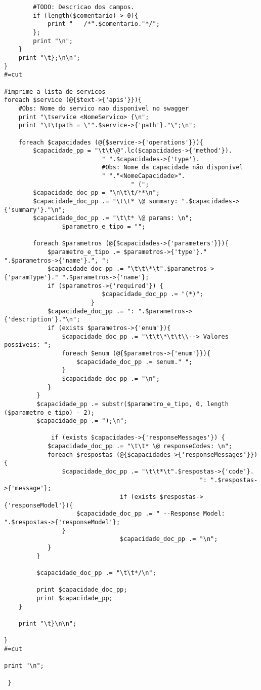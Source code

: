 \begin{lstlisting}
		#TODO: Descricao dos campos.
		if (length($comentario) > 0){
			print "   /*".$comentario."*/";
		};
		print "\n";
	}
	print "\t};\n\n";
}
#=cut

#imprime a lista de servicos
foreach $service (@{$text->{'apis'}}){
	#Obs: Nome do servico nao disponível no swagger
	print "\tservice <NomeServico> {\n";
	print "\t\tpath = \"".$service->{'path'}."\";\n";
     	
	foreach $capacidades (@{$service->{'operations'}}){
		$capacidade_pp = "\t\t\@".lc($capacidades->{'method'}).
		                   " ".$capacidades->{'type'}.
		                   #Obs: Nome da capacidade não disponível
		                   " "."<NomeCapacidade>".
                                   " (";
		$capacidade_doc_pp = "\n\t\t/**\n";
		$capacidade_doc_pp .= "\t\t* \@ summary: ".$capacidades->{'summary'}."\n";
		$capacidade_doc_pp .= "\t\t* \@ params: \n";
                $parametro_e_tipo = "";

		foreach $parametros (@{$capacidades->{'parameters'}}){
			$parametro_e_tipo .= $parametros->{'type'}." ".$parametros->{'name'}.", ";
			$capacidade_doc_pp .= "\t\t\*\t".$parametros->{'paramType'}." ".$parametros->{'name'};
			if ($parametros->{'required'}) {
                	       $capacidade_doc_pp .= "(*)";
                        }
			$capacidade_doc_pp .= ": ".$parametros->{'description'}."\n";
			if (exists $parametros->{'enum'}){
				$capacidade_doc_pp .= "\t\t\*\t\t\\--> Valores possiveis: ";
				foreach $enum (@{$parametros->{'enum'}}){
					$capacidade_doc_pp .= $enum." ";
				}
				$capacidade_doc_pp .= "\n";
			}
		 }
		 $capacidade_pp .= substr($parametro_e_tipo, 0, length ($parametro_e_tipo) - 2);
		 $capacidade_pp .= ");\n";
		
	         if (exists $capacidades->{'responseMessages'}) {
		 	$capacidade_doc_pp .= "\t\t* \@ responseCodes: \n";
		 	foreach $respostas (@{$capacidades->{'responseMessages'}}){
		 		$capacidade_doc_pp .= "\t\t*\t".$respostas->{'code'}.
                                                      ": ".$respostas->{'message'};
                                if (exists $respostas->{'responseModel'}){
					$capacidade_doc_pp .= " --Response Model: ".$respostas->{'responseModel'};
				}
                                $capacidade_doc_pp .= "\n";
			}
		 }

		 $capacidade_doc_pp .= "\t\t*/\n";     
		
		 print $capacidade_doc_pp;
		 print $capacidade_pp;
	}

	print "\t}\n\n";
	
}
#=cut

print "\n";

 } 
 \end{lstlisting}